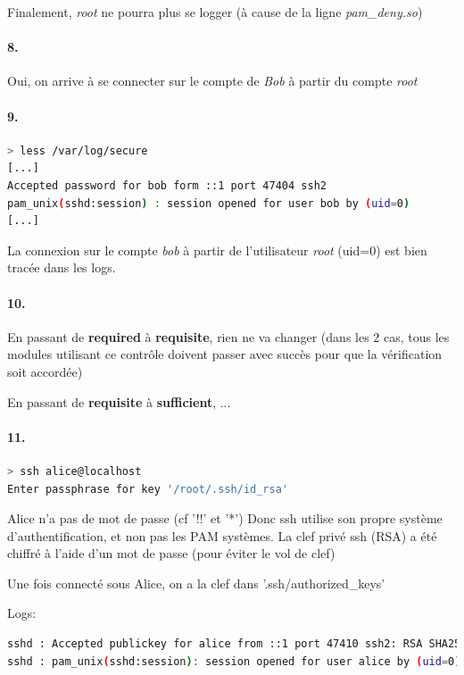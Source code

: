 \documentclass[10pt]{article}
\begin{document}
        Finalement, \textit{root} ne pourra plus se logger (à cause de la ligne \textit{pam\_deny.so})

        
        \paragraph{8.} Oui, on arrive à se connecter sur le compte de \textit{Bob} à partir du compte \textit{root}
        
        \paragraph{9.}

\begin{lstlisting}[language=bash]
> less /var/log/secure
[...]
Accepted password for bob form ::1 port 47404 ssh2
pam_unix(sshd:session) : session opened for user bob by (uid=0)
[...]
\end{lstlisting}

La connexion sur le compte \textit{bob} à partir de l'utilisateur \textit{root} (uid=0) est bien tracée dans les logs.

        \paragraph{10.}
        En passant de \textbf{required} à \textbf{requisite}, rien ne va changer (dans les 2 cas, tous les modules utilisant ce contrôle doivent passer avec succès pour que la vérification soit accordée)
        
        En passant de \textbf{requisite} à \textbf{sufficient}, ...
        
        
        \paragraph{11.}
\begin{lstlisting}[language=bash]
> ssh alice@localhost
Enter passphrase for key '/root/.ssh/id_rsa'
\end{lstlisting}

Alice n'a pas de mot de passe (cf '!!' et '*')
Donc ssh utilise son propre système d'authentification, et non pas les PAM systèmes.
La clef privé ssh (RSA) a été chiffré à l'aide d'un mot de passe (pour éviter le vol de clef)

Une fois connecté sous Alice, on a la clef dans '.ssh/authorized\_keys'

Logs:
\begin{lstlisting}[language=bash]
sshd : Accepted publickey for alice from ::1 port 47410 ssh2: RSA SHA256:/JdhKRDYT.....
sshd : pam_unix(sshd:session): session opened for user alice by (uid=0)
\end{lstlisting}
\end{document}
